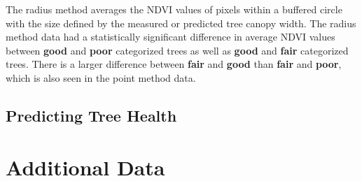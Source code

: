 \documentclass[12pt,twoside]{reedthesis}
\begin{document}
The radius method averages the NDVI values of pixels within a buffered
circle with the size defined by the measured or predicted tree canopy
width. The radius method data had a statistically significant difference
in average NDVI values between \textbf{good} and \textbf{poor} categorized trees
as well as \textbf{good} and \textbf{fair} categorized trees. There is a larger
difference between \textbf{fair} and \textbf{good} than \textbf{fair} and \textbf{poor},
which is also seen in the point method data.

\hypertarget{predicting-tree-health}{%
\section{Predicting Tree Health}\label{predicting-tree-health}}

\appendix

\hypertarget{data}{%
\chapter{Additional Data}\label{data}}
\end{document}
